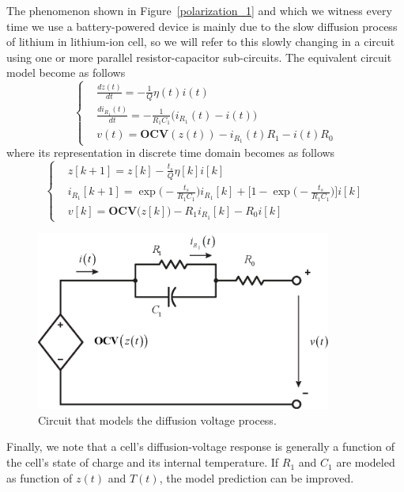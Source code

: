 \documentclass[11pt,a4paper,oneside]{book}
\numberwithin{equation}{section}
\theoremstyle{it}
\theoremstyle{definition}
\begin{document}
The phenomenon shown in Figure~\ref{polarization_1} and which we witness every time we use a battery-powered device is mainly due to the slow diffusion process of lithium in  lithium-ion cell, so we will refer to this slowly changing in a circuit using one or more parallel resistor-capacitor sub-circuits. The equivalent circuit model become as follows
\begin{equation}
	\left\lbrace \begin{aligned}
		&	\frac{dz(t)}{dt} = -\frac{1}{Q}\eta(t)i(t) \\[6pt]
		&	\frac{di_{R_1}(t)}{dt} = -\frac{1}{R_1C_1}\Big(i_{R_1}(t)-i(t)\Big) \\[6pt]
		&	v(t) = \mathbf{OCV}(z(t)) - i_{R_1}(t)R_1 - i(t)R_0
	\end{aligned}\right. 
\end{equation}
where its representation in discrete time domain becomes as follows
\begin{equation}
	\left\lbrace \begin{aligned}
		&	z[k+1] =z[k] -\frac{t_s}{Q}\eta[k]i[k] \\[6pt]
		&	i_{R_1}[k+1] = \exp\Big(-\frac{t_s}{R_1C_1}\Big)i_{R_1}[k]+\Big[1-\exp\Big(-\frac{t_s}{R_1C_1}\Big)\Big]i[k] \\[6pt]
		&	v[k] = \mathbf{OCV}\Big(z[k]\Big) -R_1i_{R_1}[k] - R_0i[k]
	\end{aligned}\right. 
\end{equation}
\begin{figure}[H]
	\centering
	\includegraphics[width = 275pt, angle = 0, keepaspectratio]{figures/lithium_ion_battery/cell_eq_circuit_3.eps}
	\captionsetup{width=0.5\textwidth, font=small}		
	\caption{Circuit that models the diffusion voltage process.}
	\label{OCV_soc_4}
\end{figure}
Finally, we note that a cell's diffusion-voltage response is generally a function of the cell's state of charge and its internal temperature. If $R_1$ and $C_1$ are modeled as function of $z(t)$ and $T(t)$, the model prediction can be improved.
\end{document}

